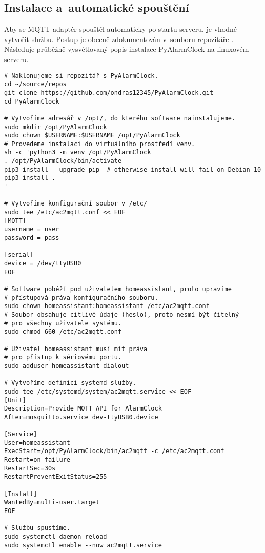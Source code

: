 \subsection{Instalace a~automatické spouštění}
Aby se MQTT adaptér spouštěl automaticky po startu serveru, je vhodné vytvořit
 službu. Postup je obecně zdokumentován v~souboru
 repozitáře . Následuje průběžně
vysvětlovaný popis instalace PyAlarmClock na linuxovém serveru.
\begin{lstlisting}[language=mybash, style=numbers]
# Naklonujeme si repozitář s PyAlarmClock.
cd ~/source/repos
git clone https://github.com/ondras12345/PyAlarmClock.git
cd PyAlarmClock

# Vytvoříme adresář v /opt/, do kterého software nainstalujeme.
sudo mkdir /opt/PyAlarmClock
sudo chown $USERNAME:$USERNAME /opt/PyAlarmClock
# Provedeme instalaci do virtuálního prostředí venv.
sh -c 'python3 -m venv /opt/PyAlarmClock
. /opt/PyAlarmClock/bin/activate
pip3 install --upgrade pip  # otherwise install will fail on Debian 10
pip3 install .
'

# Vytvoříme konfigurační soubor v /etc/
sudo tee /etc/ac2mqtt.conf << EOF
[MQTT]
username = user
password = pass

[serial]
device = /dev/ttyUSB0
EOF

# Software poběží pod uživatelem homeassistant, proto upravíme
# přístupová práva konfiguračního souboru.
sudo chown homeassistant:homeassistant /etc/ac2mqtt.conf
# Soubor obsahuje citlivé údaje (heslo), proto nesmí být čitelný
# pro všechny uživatele systému.
sudo chmod 660 /etc/ac2mqtt.conf

# Uživatel homeassistant musí mít práva
# pro přístup k sériovému portu.
sudo adduser homeassistant dialout

# Vytvoříme definici systemd služby.
sudo tee /etc/systemd/system/ac2mqtt.service << EOF
[Unit]
Description=Provide MQTT API for AlarmClock
After=mosquitto.service dev-ttyUSB0.device

[Service]
User=homeassistant
ExecStart=/opt/PyAlarmClock/bin/ac2mqtt -c /etc/ac2mqtt.conf
Restart=on-failure
RestartSec=30s
RestartPreventExitStatus=255

[Install]
WantedBy=multi-user.target
EOF

# Službu spustíme.
sudo systemctl daemon-reload
sudo systemctl enable --now ac2mqtt.service
\end{lstlisting}

